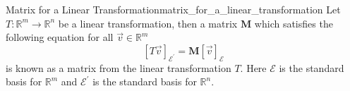\begin{definition}{Matrix for a Linear Transformation}{matrix_for_a_linear_transformation}
Let $T: \mathbb{R}^{m} \rightarrow \mathbb{R}^{n}$ be a linear
transformation, then a matrix $ \boldsymbol{ M }  $ which satisfies the following equation for
all $ \vec{v} \in  \mathbb{R}  ^{ m }  $ 
\[
\left[T \vec{v}\right]_{\mathcal{E}^{\prime}}= \boldsymbol{ M } [\vec{v}]_{\mathcal{E}}
\]
is known as a matrix from the linear transformation $ T $. Here $\mathcal{E}$ is
the standard basis for $\mathbb{R}^{m}$ and $\mathcal{E}^{\prime}$ is the
standard basis for $\mathbb{R}^{n}$.
\end{definition}
